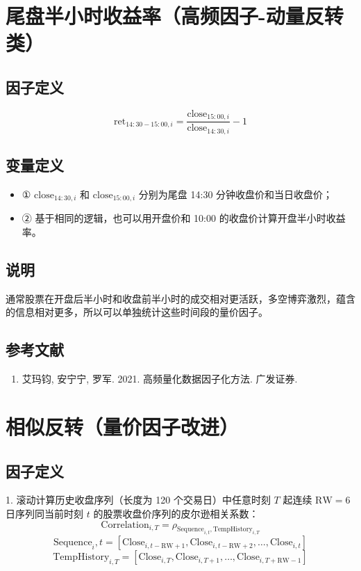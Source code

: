 \documentclass{article}
\begin{document}
\section{尾盘半小时收益率（高频因子-动量反转类）}

\subsection{因子定义}
\begin{equation}
    \mathrm{ret}_{14:30-15:00,i} = \frac{\mathrm{close}_{15:00,i}}{\mathrm{close}_{14:30,i}} - 1
\end{equation}

\subsection{变量定义}
\begin{itemize}
    \item ① \( \mathrm{close}_{14:30,i} \) 和 \( \mathrm{close}_{15:00,i} \) 分别为尾盘 14:30 分钟收盘价和当日收盘价；
    \item ② 基于相同的逻辑，也可以用开盘价和 10:00 的收盘价计算开盘半小时收益率。
\end{itemize}

\subsection{说明}
通常股票在开盘后半小时和收盘前半小时的成交相对更活跃，多空博弈激烈，蕴含的信息相对更多，所以可以单独统计这些时间段的量价因子。

\subsection{参考文献}
\begin{enumerate}
    \item 艾玛钧, 安宁宁, 罗军. 2021. 高频量化数据因子化方法. 广发证券.
\end{enumerate}

\section{相似反转（量价因子改进）}

\subsection{因子定义}
1. 滚动计算历史收盘序列（长度为 120 个交易日）中任意时刻 \( T \) 起连续 \( \mathrm{RW}=6 \) 日序列同当前时刻 \( t \) 的股票收盘价序列的皮尔逊相关系数：
\begin{equation}
    \mathrm{Correlation}_{i,T} = \rho_{\mathrm{Sequence}_{i,t}, \mathrm{Temp  History}_{i,T}}
\end{equation}
\begin{equation}
    \mathrm{Sequence}_{i},t = [\mathrm{Close}_{i,t-\mathrm{RW}+1}, \mathrm{Close}_{i,t-\mathrm{RW}+2}, \dots, \mathrm{Close}_{i,t}]
\end{equation}
\begin{equation}
    \mathrm{Temp  History}_{i,T} = [\mathrm{Close}_{i,T}, \mathrm{Close}_{i,T+1}, \dots, \mathrm{Close}_{i,T+\mathrm{RW}-1}]
\end{equation}
\end{document}
